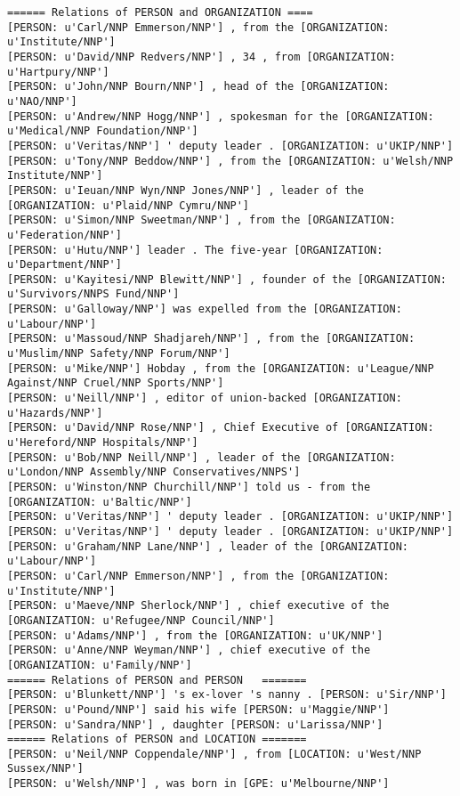 \documentclass[12pt]{report}
\begin{document}
\begin{scriptsize}
\begin{verbatim}
====== Relations of PERSON and ORGANIZATION ====
[PERSON: u'Carl/NNP Emmerson/NNP'] , from the [ORGANIZATION: u'Institute/NNP']
[PERSON: u'David/NNP Redvers/NNP'] , 34 , from [ORGANIZATION: u'Hartpury/NNP']
[PERSON: u'John/NNP Bourn/NNP'] , head of the [ORGANIZATION: u'NAO/NNP']
[PERSON: u'Andrew/NNP Hogg/NNP'] , spokesman for the [ORGANIZATION: u'Medical/NNP Foundation/NNP']
[PERSON: u'Veritas/NNP'] ' deputy leader . [ORGANIZATION: u'UKIP/NNP']
[PERSON: u'Tony/NNP Beddow/NNP'] , from the [ORGANIZATION: u'Welsh/NNP Institute/NNP']
[PERSON: u'Ieuan/NNP Wyn/NNP Jones/NNP'] , leader of the [ORGANIZATION: u'Plaid/NNP Cymru/NNP']
[PERSON: u'Simon/NNP Sweetman/NNP'] , from the [ORGANIZATION: u'Federation/NNP']
[PERSON: u'Hutu/NNP'] leader . The five-year [ORGANIZATION: u'Department/NNP']
[PERSON: u'Kayitesi/NNP Blewitt/NNP'] , founder of the [ORGANIZATION: u'Survivors/NNPS Fund/NNP']
[PERSON: u'Galloway/NNP'] was expelled from the [ORGANIZATION: u'Labour/NNP']
[PERSON: u'Massoud/NNP Shadjareh/NNP'] , from the [ORGANIZATION: u'Muslim/NNP Safety/NNP Forum/NNP']
[PERSON: u'Mike/NNP'] Hobday , from the [ORGANIZATION: u'League/NNP Against/NNP Cruel/NNP Sports/NNP']
[PERSON: u'Neill/NNP'] , editor of union-backed [ORGANIZATION: u'Hazards/NNP']
[PERSON: u'David/NNP Rose/NNP'] , Chief Executive of [ORGANIZATION: u'Hereford/NNP Hospitals/NNP']
[PERSON: u'Bob/NNP Neill/NNP'] , leader of the [ORGANIZATION: u'London/NNP Assembly/NNP Conservatives/NNPS']
[PERSON: u'Winston/NNP Churchill/NNP'] told us - from the [ORGANIZATION: u'Baltic/NNP']
[PERSON: u'Veritas/NNP'] ' deputy leader . [ORGANIZATION: u'UKIP/NNP']
[PERSON: u'Veritas/NNP'] ' deputy leader . [ORGANIZATION: u'UKIP/NNP']
[PERSON: u'Graham/NNP Lane/NNP'] , leader of the [ORGANIZATION: u'Labour/NNP']
[PERSON: u'Carl/NNP Emmerson/NNP'] , from the [ORGANIZATION: u'Institute/NNP']
[PERSON: u'Maeve/NNP Sherlock/NNP'] , chief executive of the [ORGANIZATION: u'Refugee/NNP Council/NNP']
[PERSON: u'Adams/NNP'] , from the [ORGANIZATION: u'UK/NNP']
[PERSON: u'Anne/NNP Weyman/NNP'] , chief executive of the [ORGANIZATION: u'Family/NNP']
====== Relations of PERSON and PERSON	=======
[PERSON: u'Blunkett/NNP'] 's ex-lover 's nanny . [PERSON: u'Sir/NNP']
[PERSON: u'Pound/NNP'] said his wife [PERSON: u'Maggie/NNP']
[PERSON: u'Sandra/NNP'] , daughter [PERSON: u'Larissa/NNP']
====== Relations of PERSON and LOCATION	=======
[PERSON: u'Neil/NNP Coppendale/NNP'] , from [LOCATION: u'West/NNP Sussex/NNP']
[PERSON: u'Welsh/NNP'] , was born in [GPE: u'Melbourne/NNP']

\end{verbatim}
\end{scriptsize}
\end{document}
